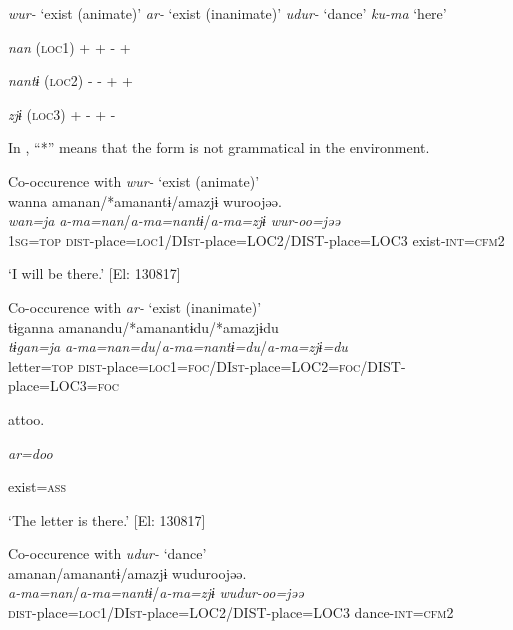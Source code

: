 \begin{table}
\begin{table}
    \textit{wur-} ‘exist (animate)’  \textit{ar-} ‘exist (inanimate)’  \textit{udur-} ‘dance’    \textit{ku-ma} ‘here’

\textit{nan}  (\textsc{loc}1)  +  +  -    +

\textit{nantɨ}  (\textsc{loc}2)  -  -  +    +

\textit{zjɨ}  (\textsc{loc}3)  +  -  +    -
\end{table}

In , “*” means that the form is not grammatical in the environment.

\ea\label{ex:6-83}
 \ea Co-occurence with \textit{wur-} ‘exist (animate)’\\

{\TM}
\glll wanna  amanan/*amanantɨ/amazjɨ  wuroojəə.\\
\textit{wan=ja}  \textit{a-ma=nan}/\textit{a-ma=nantɨ}/\textit{a-ma=zjɨ}  \textit{wur-oo=jəə}\\

    1\textsc{sg}=\textsc{top}  \textsc{dist}-place=\textsc{loc}1/DI\textsc{st}-place=LOC2/DIST-place=LOC3  exist-\textsc{int}=\textsc{cfm}2

\glt    ‘I will be there.’ [El: 130817]

\ex Co-occurence with \textit{ar-} ‘exist (inanimate)’\\

{\TM}
\glll tɨganna  amanandu/*amanantɨdu/*amazjɨdu\\
\textit{tɨgan=ja}  \textit{a-ma=nan=du}/\textit{a-ma=nantɨ=du}/\textit{a-ma=zjɨ=du}\\

    letter=\textsc{top}  \textsc{dist}-place=\textsc{loc}1=\textsc{foc}/DI\textsc{st}-place=LOC2=\textsc{foc}/DIST-place=LOC3=\textsc{foc}

    attoo.  

    \textit{ar=doo}  

    exist=\textsc{ass}

\glt    ‘The letter is there.’ [El: 130817]

\ex Co-occurence with \textit{udur-} ‘dance’\\

{\TM}
\glll *amanan/amanantɨ/amazjɨ  wuduroojəə.\\
\textit{a-ma=nan}/\textit{a-ma=nantɨ}/\textit{a-ma=zjɨ}  \textit{wudur-oo=jəə}\\

    \textsc{dist}-place=\textsc{loc}1/DI\textsc{st}-place=LOC2/DIST-place=LOC3  dance-\textsc{int}=\textsc{cfm}2


\end{table}
